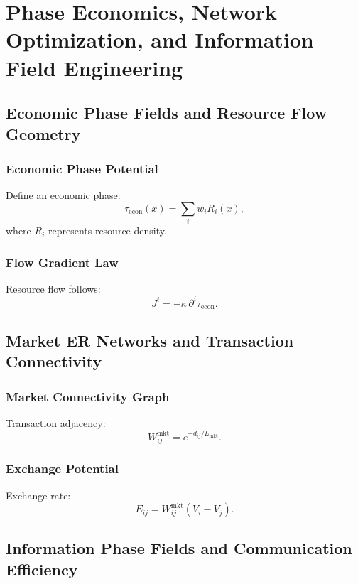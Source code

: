 

\part{Phase Economics, Network Optimization, and Information Field Engineering}

\chapter{Economic Phase Fields and Resource Flow Geometry}

\section{Economic Phase Potential}
Define an economic phase:
\[
\tau_{\mathrm{econ}}(x) = \sum_i w_i R_i(x),
\]
where \(R_i\) represents resource density.

\section{Flow Gradient Law}
Resource flow follows:
\[
J^i = -\kappa\,\partial^i\tau_{\mathrm{econ}}.
\]

\chapter{Market ER Networks and Transaction Connectivity}

\section{Market Connectivity Graph}
Transaction adjacency:
\[
W^{\mathrm{mkt}}_{ij} = e^{-d_{ij}/L_{\mathrm{mkt}}}.
\]

\section{Exchange Potential}
Exchange rate:
\[
E_{ij} = W^{\mathrm{mkt}}_{ij}(V_i - V_j).
\]

\chapter{Information Phase Fields and Communication Efficiency}

